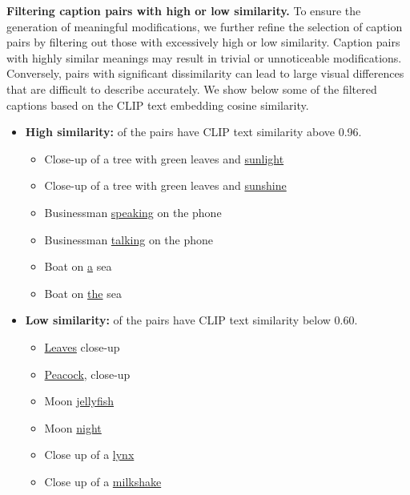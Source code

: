 \noindent\textbf{Filtering caption pairs with high or low similarity.} 
To ensure the generation of meaningful modifications, 
we further refine the selection of caption pairs by filtering out 
those with excessively high or low similarity. 
Caption pairs with highly similar meanings may result 
in trivial or unnoticeable modifications. 
Conversely, pairs with significant dissimilarity can lead to large visual 
differences that are difficult to describe accurately.
We show below some of the filtered captions based on the CLIP text embedding cosine similarity.
\begin{itemize}
    \item \textbf{High similarity:}  of the pairs have CLIP text similarity above 0.96.
    \begin{itemize}
        \item Close-up of a tree with green leaves and \underline{sunlight}
        \item Close-up of a tree with green leaves and \underline{sunshine}
    \end{itemize}
    \begin{itemize}
        \item Businessman \underline{speaking} on the phone
        \item Businessman \underline{talking} on the phone
    \end{itemize}
    \begin{itemize}
        \item Boat on \underline{a} sea
        \item Boat on \underline{the} sea
    \end{itemize}
    \item \textbf{Low similarity:}  of the pairs have CLIP text similarity below 0.60.
    \begin{itemize}
        \item \underline{Leaves} close-up
        \item \underline{Peacock}, close-up
    \end{itemize}
    \begin{itemize}
        \item Moon \underline{jellyfish}
        \item Moon \underline{night}
    \end{itemize}
    \begin{itemize}
        \item Close up of a \underline{lynx}
        \item Close up of a \underline{milkshake}
    \end{itemize}
\end{itemize}

